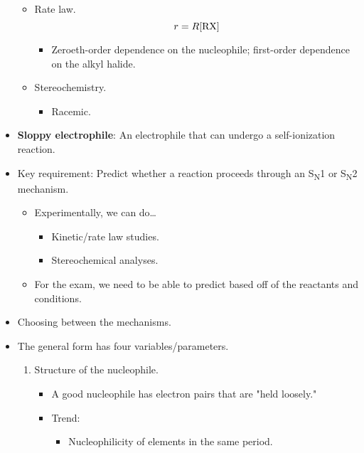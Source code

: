 \documentclass[../notes.tex]{subfiles}
\begin{document}
\begin{itemize}
\begin{itemize}
\begin{itemize}
        \end{itemize}
        \item Rate law.
        \begin{equation*}
            r = R[\ce{RX}]
        \end{equation*}
        \begin{itemize}
            \item Zeroeth-order dependence on the nucleophile; first-order dependence on the alkyl halide.
        \end{itemize}
        \item Stereochemistry.
        \begin{itemize}
            \item Racemic.
        \end{itemize}
    \end{itemize}
    \item \textbf{Sloppy electrophile}: An electrophile that can undergo a self-ionization reaction.
    \item Key requirement: Predict whether a reaction proceeds through an S\textsubscript{N}1 or S\textsubscript{N}2 mechanism.
    \begin{itemize}
        \item Experimentally, we can do\dots
        \begin{itemize}
            \item Kinetic/rate law studies.
            \item Stereochemical analyses.
        \end{itemize}
        \item For the exam, we need to be able to predict based off of the reactants and conditions.
    \end{itemize}
    \item Choosing between the mechanisms.
    \item The general form has four variables/parameters.
    \begin{enumerate}
        \item Structure of the nucleophile.
        \begin{itemize}
            \item A good nucleophile has electron pairs that are "held loosely."
            \item Trend:
            \begin{itemize}
                \item Nucleophilicity of elements in the same period.
                \begin{equation*}

\end{equation*}
\end{itemize}
\end{itemize}
\end{enumerate}
\end{itemize}
\end{document}
